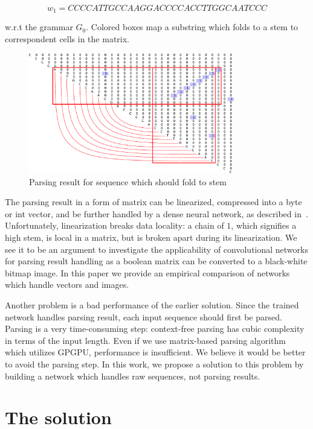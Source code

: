 \documentclass[12pt,a4paper]{cibb}
\begin{document}
\[
w_1 = CCCCATTGCCAAGGACCCCACCTTGGCAATCCC
\]

w.r.t the grammar $G_0$.
Colored boxes map a substring which folds to a stem to correspondent cells in the matrix.

\begin{figure}[h]
\begin{center}
\centering
\includegraphics[width=0.8\textwidth]{figures/4.pdf}
\caption{Parsing result for sequence which should fold to
stem}
\label{fig:example}
\end{center}
\end{figure}

The parsing result in a form of matrix can be linearized, compressed into a byte or int vector, and be further handled by a dense neural network, as described in~\cite{grigorevcomposition}.
Unfortunately, linearization breaks data locality: a chain of $1$, which signifies a high stem, is local in a matrix, but is broken apart during its linearization.
We see it to be an argument to investigate the applicability of convolutional networks for parsing result handling as a boolean matrix can be converted to a black-white bitmap image.
In this paper we provide an empirical comparison of networks which handle vectors and images.

Another problem is a bad performance of the earlier solution.
Since the trained network handles parsing result, each input sequence should first be parsed.
Parsing is a very time-consuming step: context-free parsing has cubic complexity in terms of the input length.
Even if we use matrix-based parsing algorithm~\cite{Azimov:2018:CPQ:3210259.3210264} which utilizes GPGPU, performance is insufficient.
We believe it would be better to avoid the parsing step.
In this work, we propose a solution to this problem by building a network which handles raw sequences, not parsing results.

\section{\bf The solution}
\end{document}
